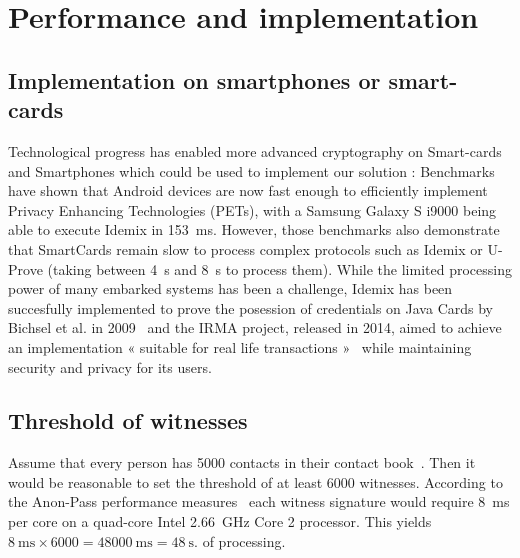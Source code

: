 \section{Performance and implementation}

\subsection{Implementation on smartphones or smart-cards}
Technological progress has enabled more advanced cryptography on Smart-cards and Smartphones which could be used to implement our solution : Benchmarks~\cite{Benchmarking} have shown that Android devices are now fast enough to efficiently implement Privacy Enhancing Technologies (PETs), with a Samsung Galaxy S i9000 being able to execute Idemix in  \SI{153}{\milli\second}. However, those benchmarks also demonstrate that SmartCards remain slow to process complex protocols such as Idemix or U-Prove (taking between \SI{4}{\second} and \SI{8}{\second} to process them). While the limited processing power of many embarked systems has been a challenge, Idemix has been succesfully implemented to prove the posession of credentials on Java Cards by Bichsel et al. in 2009~\cite{Bichsel} and the IRMA project, released in 2014, aimed to achieve an implementation « suitable for real life transactions »~\cite{IRMA} while maintaining security and privacy for its users. 

\subsection{Threshold of witnesses}

Assume that every person has 5000 contacts in their contact 
book~\cite{DifficultyOfPrivateContactDiscovery}.
Then it would be reasonable to set the threshold of at least 6000 witnesses.
According to the Anon-Pass performance measures~\cite{AnonPass} each witness 
signature would require \SI{8}{\milli\second} per core on a quad-core Intel 
\SI{2.66}{\giga\hertz} Core 2 processor.
This yields \(
  \SI{8}{\milli\second}\times 6000 = \SI{48000}{\milli\second} = 
  \SI{48}{\second}.
\) of processing.

